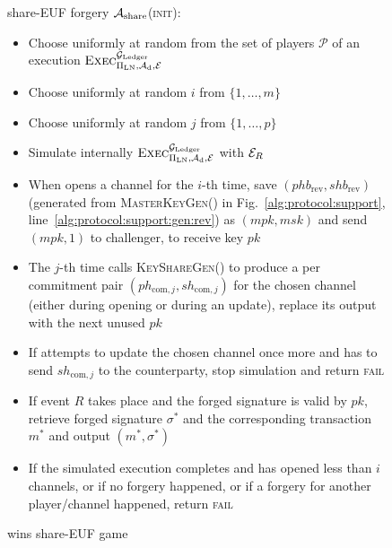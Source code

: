   \begin{figure}[H]
    \begin{algobox}{\textsf{share-EUF} forgery}
      $\mathcal{A}_{\mathrm{share}}$(\textsc{init}):
      \begin{itemize}
        \item Choose uniformly at random \alice{} from the set of players
        $\mathcal{P}$ of an execution
        $\textsc{Exec}^{\mathcal{G}_{\mathrm{Ledger}}}_{\Pi_{\mathrm{LN}}, \mathcal{A}_{\mathrm{d}},
        \mathcal{E}}$
        \item Choose uniformly at random $i$ from $\{1, \dots, m\}$
        \item Choose uniformly at random $j$ from $\{1, \dots, p\}$
        \item Simulate internally
        $\textsc{Exec}^{\mathcal{G}_{\mathrm{Ledger}}}_{\Pi_{\mathrm{LN}}, \mathcal{A}_{\mathrm{d}},
        \mathcal{E}}$ with $\mathcal{E}_R$
        \item When \alice{} opens a channel for the $i$-th time,
        save $(phb_{\mathrm{rev}}, shb_{\mathrm{rev}})$ (generated from
        \textsc{MasterKeyGen}() in Fig.~\ref{alg:protocol:support},
        line~\ref{alg:protocol:support:gen:rev}) as $(mpk, msk)$ and send $(mpk,
        1)$ to challenger, to receive key $pk$
        \item The $j$-th time \alice{} calls \textsc{KeyShareGen}() to produce a
        per commitment pair $(ph_{\mathrm{com}, j}, sh_{\mathrm{com}, j})$ for
        the chosen channel (either during opening or during an update), replace
        its output with the next unused $pk$
        \item If \alice{} attempts to update the chosen channel once more and
        has to send $sh_{\mathrm{com}, j}$ to the counterparty, stop simulation
        and return \textsc{fail}
        \item If event $R$ takes place and the forged signature is valid by
        $pk$, retrieve forged signature $\sigma^*$ and the corresponding
        transaction $m^*$ and output $(m^*, \sigma^*)$
        \item If the simulated execution completes and \alice{} has opened less
        than $i$ channels, or if no forgery happened, or if a forgery for
        another player/channel happened, return \textsc{fail}
      \end{itemize}
    \end{algobox}
    \caption{wins \textsf{share-EUF} game}
    \label{alg:forge:share}
  \end{figure}

